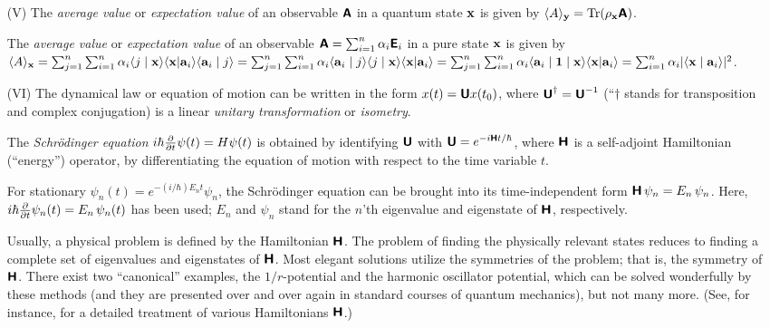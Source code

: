 {\begin{itemize}
\item[(V)]
The {\em average value} or {\em expectation value} of an observable
$\textsf{\textbf{A}}$ in a quantum  state
${\bf x}$
is given by
$\langle A\rangle_{\bf y} =
\textrm{Tr} ({    \rho}_{{\bf x}} \textsf{\textbf{A}})$.

The {\em average value} or {\em expectation value} of an observable
$  \textsf{\textbf{A}} =\sum_{i=1}^n \alpha_i    \textsf{\textbf{E}}_i$ in a pure  state
${\bf x}$
is given by
$\langle A\rangle_{\bf x} =
\sum_{j=1}^n \sum_{i=1}^n \alpha_i
\langle j \mid   {{\bf x}}\rangle \langle {{\bf x}} \vert  {\bf a}_i\rangle \langle {\bf a}_i \mid  j  \rangle =
\sum_{j=1}^n \sum_{i=1}^n \alpha_i
 \langle {\bf a}_i \mid  j  \rangle \langle j \mid   {{\bf x}}\rangle \langle {{\bf x}} \vert  {\bf a}_i\rangle =
\sum_{j=1}^n \sum_{i=1}^n \alpha_i
 \langle {\bf a}_i \mid {\bf 1} \mid    {{\bf x}}\rangle \langle {{\bf x}} \vert  {\bf a}_i\rangle =
\sum_{i=1}^n \alpha_i
\vert \langle {\bf x}\mid {\bf a}_i\rangle \vert^2$.

\item[(VI)]
The dynamical law or equation of motion can be written in the form
$x (t) =\textsf{\textbf{U}}x (t_0) $,
where $\textsf{\textbf{U}}^\dagger =\textsf{\textbf{U}}^{-1}$ (``$\dagger $ stands for transposition and
complex conjugation) is a
linear {\em unitary transformation} or {\em isometry}.

The {\em Schr\"odinger equation}
$
i\hbar {\partial \over \partial t}  \psi (t)    =
H \psi (t) $
 is obtained by identifying $\textsf{\textbf{U}}$ with
$\textsf{\textbf{U}}=e^{-i\textsf{\textbf{H}}t/\hbar }$,
where $\textsf{\textbf{H}}$ is a self-adjoint  Hamiltonian (``energy'') operator,
by differentiating the equation of motion
with respect to the time variable $t$.

For stationary $ \psi_n
(t)=
e^{-(i/\hbar )E_nt}  \psi_n $, the Schr\"odinger equation
can be brought into its time-independent form
$\textsf{\textbf{H}}\, \psi_n
=
E_n\, \psi_n $.
Here,
$i\hbar {\partial \over \partial t} \psi_n (t)
=
E_n \, \psi_n (t) $  has been used;
$E_n$
and $\psi_n $
stand for the $n$'th eigenvalue and eigenstate of
$\textsf{\textbf{H}}$, respectively.

Usually, a physical problem is defined by the Hamiltonian ${\textsf{\textbf{H}}}$.
The problem of finding the physically relevant states reduces to finding
a complete set of eigenvalues and eigenstates of ${\textsf{\textbf{H}}}$.
Most elegant solutions utilize the symmetries of the problem; that is, the symmetry of
${\textsf{\textbf{H}}}$. There exist two ``canonical'' examples, the $1/r$-potential
and
the harmonic oscillator potential, which can be solved wonderfully by
these methods (and they are presented over and over again in standard
courses of quantum mechanics), but not many more. (See, for instance,
\cite{davydov} for a detailed treatment of various Hamiltonians ${\textsf{\textbf{H}}}$.)
\end{itemize}





}
